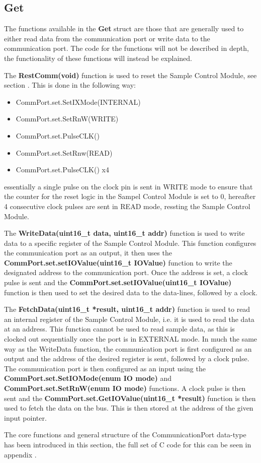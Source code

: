 \subsection*{Get}
The functions available in the \textbf{Get} struct are those that are generally used to either read data from the communication port or write data to the communication port. The code for the functions will not be described in depth, the functionality of these functions will instead be explained. 

The \textbf{RestComm(void)} function is used to reset the Sample Control Module, see section . This is done in the following way:
\begin{itemize}
    \item CommPort.set.SetIXMode(INTERNAL)
    \item CommPort.set.SetRnW(WRITE)
    \item CommPort.set.PulseCLK()
    \item CommPort.set.SetRnw(READ)
    \item CommPort.set.PulseCLK() x4
\end{itemize}

essentially a single pulse on the clock pin is sent in WRITE mode to ensure that the counter for the reset logic in the Sampel Control Module is set to 0, hereafter 4 consecutive clock pulses are sent in READ mode, ressting the Sample Control Module.

The \textbf{WriteData(uint16\_t data, uint16\_t addr)} function is used to write data to a specific register of the Sample Control Module. This function configures the communication port as an output, it then uses the \textbf{CommPort.set.setIOValue(uint16\_t IOValue)} function to write the designated address to the communication port. Once the address is set, a clock pulse is sent and the \textbf{CommPort.set.setIOValue(uint16\_t IOValue)} function is then used to set the desired data to the data-lines, followed by a clock. 

The \textbf{FetchData(uint16\_t *result, uint16\_t addr)} function is used to read an internal register of the Sample Control Module, i.e. it is used to read the data at an address. This function cannot be used to read sample data, as this is clocked out sequentially once the port is in EXTERNAL mode. In much the same way as the WriteData function, the communication port is first configured as an output and the address of the desired register is sent, followed by a clock pulse. The communication port is then configured as an input using the \textbf{CommPort.set.SetIOMode(enum IO mode)} and \textbf{CommPort.set.SetRnW(enum IO mode)} functions. A clock pulse is then sent and the \textbf{CommPort.set.GetIOValue(uint16\_t *result)} function is then used to fetch the data on the bus. This is then stored at the address of the given input pointer. 

The core functions and general structure of the CommunicationPort data-type has been introduced in this section, the full set of C code for this can be seen in appendix .

